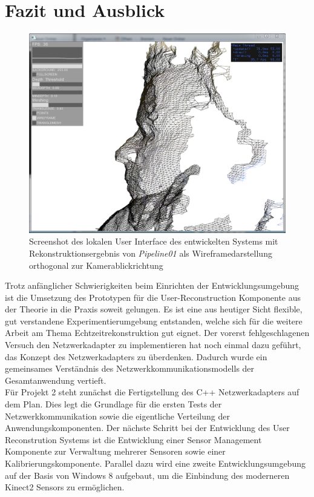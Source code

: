 \section{Fazit und Ausblick}
\begin{figure}[h]
	\begin{center}		
		\includegraphics[width=.5\textwidth, keepaspectratio]{img/screen}
		\caption{Screenshot des lokalen User Interface des entwickelten Systems mit Rekonstruktionsergebnis von \textit{Pipeline01} als Wireframedarstellung orthogonal zur Kamerablickrichtung}
		\label{fig:screen}
	\end{center}
\end{figure}
Trotz anfänglicher Schwierigkeiten beim Einrichten der Entwicklungsumgebung ist die Umsetzung des Prototypen für die User-Reconstruction Komponente aus der Theorie in die Praxis soweit gelungen. Es ist eine aus heutiger Sicht flexible, gut verstandene Experimentierumgebung entstanden, welche sich für die weitere Arbeit am Thema Echtzeitrekonstruktion gut eignet. Der vorerst fehlgeschlagenen Versuch den Netzwerkadapter zu implementieren hat noch einmal dazu geführt, das Konzept des Netzwerkadapters zu überdenken. Dadurch wurde ein gemeinsames Verständnis des Netzwerkkommunikationsmodells der Gesamtanwendung vertieft.\\
Für Projekt 2 steht zunächst die Fertigstellung des C++ Netzwerkadapters auf dem Plan. Dies legt die Grundlage für die ersten Tests der Netzwerkkommunikation sowie die eigentliche Verteilung der Anwendungskomponenten. Der nächste Schritt bei der Entwicklung des User Reconstrution Systems ist die Entwicklung einer Sensor Management Komponente zur Verwaltung mehrerer Sensoren sowie einer Kalibrierungskomponente. Parallel dazu wird eine zweite Entwicklungsumgebung auf der Basis von Windows 8 aufgebaut, um die Einbindung des moderneren Kinect2 Sensors zu ermöglichen.
